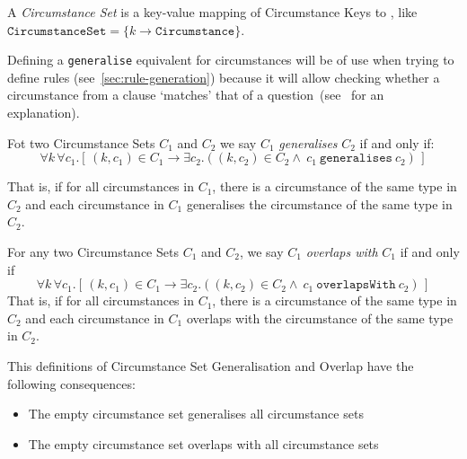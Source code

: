 \begin{definition}
    \label{def:circumstanceSet}
    A \emph{Circumstance Set} is a key-value mapping of Circumstance Keys to , like $\texttt{CircumstanceSet} = \{ k \to \texttt{Circumstance} \}$.
\end{definition}

Defining a \texttt{generalise} equivalent for circumstances will be of use when trying to define rules (see~\autoref{sec:rule-generation}) because it will allow checking whether a circumstance from a clause `matches' that of a question~(see~ for an explanation).

\begin{definition}
    \label{def:circumstanceSet:generalise}
    Fot two Circumstance Sets $C_1$ and $C_2$ we say $C_1$ \emph{generalises} $C_2$ if and only if:
    \begin{equation}
        \label{eq:circumstanceSet:generalisation}
        \forall k \, \forall c_1.[ \, (k, c_1) \in C_1 \to
        \exists c_2.((k, c_2) \in C_2  \land\ c_1\ \texttt{generalises}\ c_2)\,]
    \end{equation}

    That is, if for all circumstances in $C_1$, there is a circumstance of the same type in $C_2$ and each circumstance in $C_1$ generalises the circumstance of the same type in $C_2$.
\end{definition}

\begin{definition}
    \label{def:circumstanceSet:overlap}
    For any two Circumstance Sets $C_1$ and $C_2$, we say $C_1$ \emph{overlaps with} $C_1$ if and only if
    \begin{equation}
        \label{eq:circumstanceSet:overlap}
        \forall k \, \forall c_1.[ \, (k, c_1) \in C_1 \to
        \exists c_2.((k, c_2) \in C_2  \land\ c_1\ \texttt{overlapsWith}\ c_2)\,]
    \end{equation}
    That is, if for all circumstances in $C_1$, there is a circumstance of the same type in $C_2$ and each circumstance in $C_1$ overlaps with the circumstance of the same type in $C_2$.
\end{definition}

This definitions of Circumstance Set Generalisation and Overlap have the following consequences:
\begin{itemize}
    \item The empty circumstance set generalises all circumstance sets
    \item The empty circumstance set overlaps with all circumstance sets
\end{itemize}


